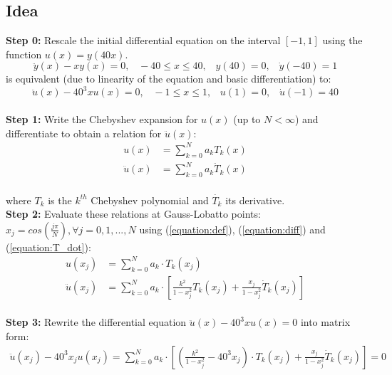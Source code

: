 \documentclass[12pt, a4paper]{article}
\begin{document}
\subsection{Idea}
\textbf{Step 0:} Rescale the initial differential equation on the interval $[-1, 1]$ using the function $u(x) = y(40x)$.
\begin{equation*}
	\ddot{y}(x)-xy(x)=0, \;\;\; -40 \leq x \leq 40, \;\;\; y(40)=0, \;\;\; \dot{y}(-40)=1
\end{equation*}
is equivalent (due to linearity of the equation and basic differentiation) to:
\begin{equation}
	\ddot{u}(x) - 40^3xu(x) = 0,  \;\;\; -1 \leq x \leq 1, \;\;\; u(1)=0, \;\;\; \dot{u}(-1)=40
\end{equation}
\\
\textbf{Step 1:} Write the Chebyshev expansion for $u(x)$ (up to $N < \infty$) and differentiate to obtain a relation for $\ddot{u}(x)$:
\begin{equation*}
\begin{split}
	u(x) & = \sum_{k=0}^{N}{a_{k}T_{k}(x)} \\
	\ddot{u}(x) & = \sum_{k=0}^{N}{a_{k}\ddot{T}_{k}(x)}
\end{split}
\end{equation*}\\
where $T_{k}$ is the $k^{th}$ Chebyshev polynomial and $\dot{T_{k}}$ its derivative.\vspace{3.0mm} \\ 
\textbf{Step 2:} Evaluate these relations at Gauss-Lobatto points: $x_{j} = cos(\frac{j\pi}{N}), \forall j=0,1,...,N$ using (\ref{equation:def}), (\ref{equation:diff}) and (\ref{equation:T_dot}):
\begin{equation*}
\begin{split}
	u(x_{j}) & = \sum_{k=0}^{N}{a_{k} \cdot T_{k}(x_{j})} \\
	\ddot{u}(x_{j}) & = \sum_{k=0}^{N}{a_{k} \cdot [\frac{k^2}{1-x_j^2}T_k(x_j) + \frac{x_j}{1-x_j^2}\dot{T}_k(x_j)]}
\end{split}
\end{equation*}\\
\textbf{Step 3:} Rewrite the differential equation $\ddot{u}(x) - 40^3xu(x) = 0$ into matrix form:
\begin{equation*}
\begin{split}
	\ddot{u}(x_j) - 40^3x_j u(x_j) = \sum_{k=0}^{N}{a_k \cdot [ (\frac{k^2}{1-x_j^2} - 40^3x_j) \cdot T_k(x_j) + \frac{x_j}{1-x_j^2}\dot{T}_k(x_j)]} = 0
\end{split}
\end{equation*}
\end{document}
